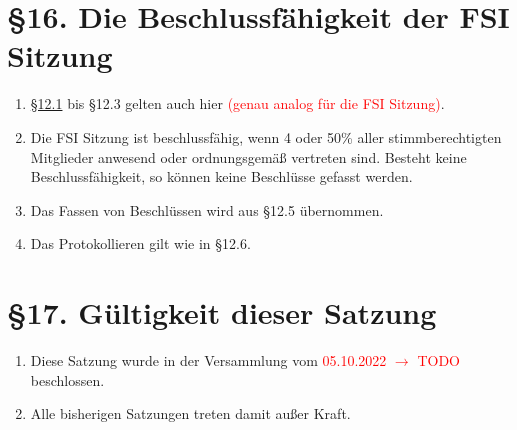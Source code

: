 \documentclass[a4paper,12pt]{article}
\newcommand{\red}[1]{\textcolor{red}{#1}}
\begin{document}
\section*{§16. Die Beschlussfähigkeit der FSI Sitzung}

\begin{enumerate}
    	\item
		\hyperref[12.1]{§12.1} bis §12.3 gelten auch hier \red{(genau analog für die FSI Sitzung)}.
    	\item
		Die FSI Sitzung ist beschlussfähig, wenn 4 oder 50\% aller
		stimmberechtigten Mitglieder anwesend oder ordnungsgemäß
		vertreten sind. Besteht keine Beschlussfähigkeit, so können
		keine Beschlüsse gefasst werden.
    	\item
		Das Fassen von Beschlüssen wird aus §12.5 übernommen.
    	\item
		Das Protokollieren gilt wie in §12.6.
\end{enumerate}

\section*{§17. Gültigkeit dieser Satzung}

\begin{enumerate}
	\item
		Diese Satzung wurde in der Versammlung vom \red{05.10.2022 $\rightarrow$ TODO}
		beschlossen.
	\item
		Alle bisherigen Satzungen treten damit außer Kraft.
\end{enumerate}
\end{document}
